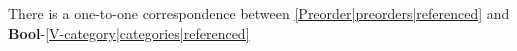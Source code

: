 
There is a one-to-one correspondence between \ref{Preorder|preorders|referenced} and \textbf{Bool}-\ref{V-category|categories|referenced}
